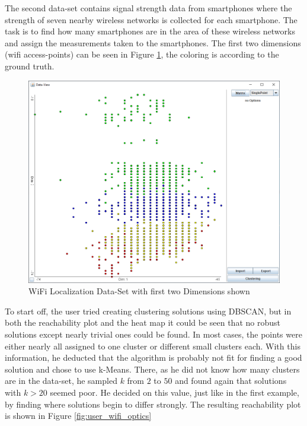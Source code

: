 \documentclass[
	a4paper,
	english,
	twoside,
	openright,               
	11pt                            
	]{report}
\begin{document}
The second data-set \cite{wireless} contains signal strength data from smartphones where the strength of seven nearby wireless networks is collected for each smartphone. The task is to find how many smartphones are in the area of these wireless networks and assign the measurements taken to the smartphones. The first two dimensions (wifi access-points) can be seen in Figure \ref{fig:user_wifi_gt}, the coloring is according to the ground truth.

\begin{figure}[h]
	\centering
	\includegraphics[scale=.5]{user_wifi_gt}
	\caption{WiFi Localization Data-Set with first two Dimensions shown}
	\label{fig:user_wifi_gt}
\end{figure}

To start off, the user tried creating clustering solutions using DBSCAN, but in both the reachability plot and the heat map it could be seen that no robust solutions except nearly trivial ones could be found. In most cases, the points were either nearly all assigned to one cluster or different small clusters each. With this information, he deducted that the algorithm is probably not fit for finding a good solution and chose to use k-Means. There, as he did not know how many clusters are in the data-set, he sampled $k$ from $2$ to $50$ and found again that solutions with $k>20$ seemed poor. He decided on this value, just like in the first example, by finding where solutions begin to differ strongly. The resulting reachability plot is shown in Figure \ref{fig:user_wifi_optics}
\end{document}
